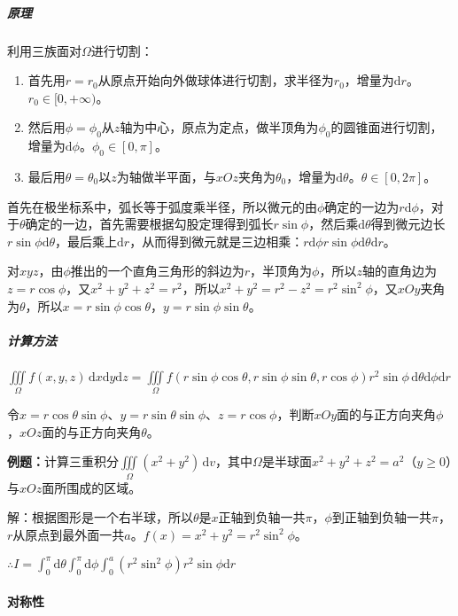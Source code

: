 \subparagraph{原理} \leavevmode \medskip

利用三族面对$\Omega$进行切割：

\begin{enumerate}
    \item 首先用$r=r_0$从原点开始向外做球体进行切割，求半径为$r_0$，增量为$\textrm{d}r$。$r_0\in[0,+\infty)$。
    \item 然后用$\phi=\phi_0$从$z$轴为中心，原点为定点，做半顶角为$\phi_0$的圆锥面进行切割，增量为$\textrm{d}\phi$。$\phi_0\in[0,\pi]$。
    \item 最后用$\theta=\theta_0$以$z$为轴做半平面，与$xOz$夹角为$\theta_0$，增量为$\textrm{d}\theta$。$\theta\in[0,2\pi]$。
\end{enumerate}

首先在极坐标系中，弧长等于弧度乘半径，所以微元的由$\phi$确定的一边为$r\textrm{d}\phi$，对于$\theta$确定的一边，首先需要根据勾股定理得到弧长$r\sin\phi$，然后乘$\textrm{d}\theta$得到微元边长$r\sin\phi\textrm{d}\theta$，最后乘上$\textrm{d}r$，从而得到微元就是三边相乘：$r\textrm{d}\phi r\sin\phi\textrm{d}\theta\textrm{d}r$。

对$xyz$，由$\phi$推出的一个直角三角形的斜边为$r$，半顶角为$\phi$，所以$z$轴的直角边为$z=r\cos\phi$，又$x^2+y^2+z^2=r^2$，所以$x^2+y^2=r^2-z^2=r^2\sin^2\phi$，又$xOy$夹角为$\theta$，所以$x=r\sin\phi\cos\theta$，$y=r\sin\phi\sin\theta$。

\subparagraph{计算方法} \leavevmode \medskip

$\iiint\limits_\Omega f(x,y,z)\,\textrm{d}x\textrm{d}y\textrm{d}z=\iiint\limits_\Omega f(r\sin\phi\cos\theta,r\sin\phi\sin\theta,r\cos\phi)r^2\sin\phi\,\textrm{d}\theta\textrm{d}\phi\textrm{d}r$

令$x=r\cos\theta\sin\phi$、$y=r\sin\theta\sin\phi$、$z=r\cos\phi$，判断$xOy$面的与正方向夹角$\phi$，$xOz$面的与正方向夹角$\theta$。

\textbf{例题：}计算三重积分$\iiint\limits_\Omega(x^2+y^2)\,\textrm{d}v$，其中$\Omega$是半球面$x^2+y^2+z^2=a^2$（$y\geqslant0$）与$xOz$面所围成的区域。

解：根据图形是一个右半球，所以$\theta$是$x$正轴到负轴一共$\pi$，$\phi$到正轴到负轴一共$\pi$，$r$从原点到最外面一共$a$。$f(x)=x^2+y^2=r^2\sin^2\phi$。

$\therefore I=\int_0^\pi\textrm{d}\theta\int_0^\pi\textrm{d}\phi\int_0^a(r^2\sin^2\phi)r^2\sin\phi\textrm{d}r$

\paragraph{对称性} \leavevmode \medskip

